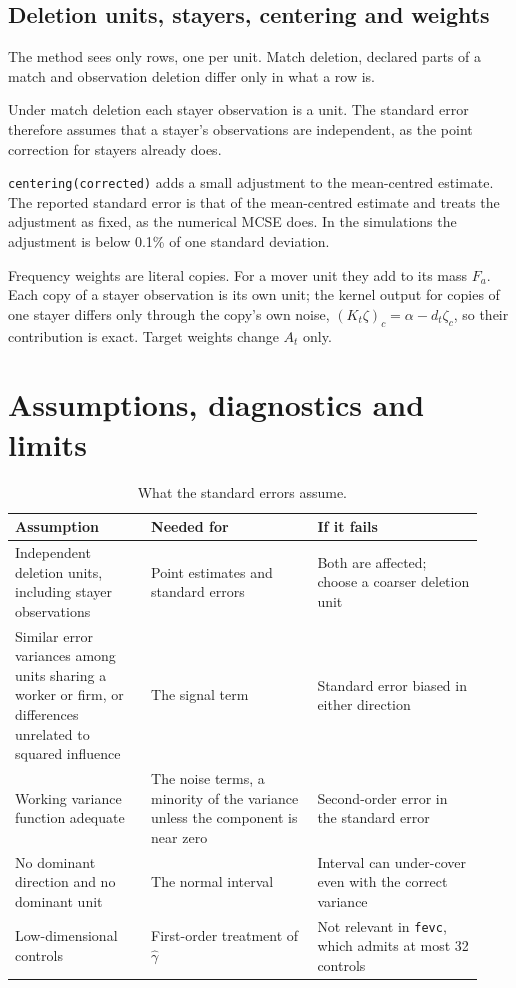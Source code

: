 \documentclass[11pt]{article}
\newcommand{\fevc}{\texttt{fevc}}
\begin{document}
\subsection{Deletion units, stayers, centering and weights}

\begin{description}[leftmargin=1.2em,style=nextline]
\item[Deletion units.] The method sees only rows, one per unit. Match
deletion, declared parts of a match and observation deletion differ only in
what a row is.
\item[Stayers.] Under match deletion each stayer observation is a unit.
The standard error therefore assumes that a stayer's observations are
independent, as the point correction for stayers already does.
\item[Corrected centering.] \texttt{centering(corrected)} adds a small
adjustment to the mean-centred estimate. The reported standard error is that
of the mean-centred estimate and treats the adjustment as fixed, as the
numerical MCSE does. In the simulations the adjustment is below 0.1\% of one
standard deviation.
\item[Weights.] Frequency weights are literal copies. For a mover unit they
add to its mass $F_a$. Each copy of a stayer observation is its own unit;
the kernel output for copies of one stayer differs only through the copy's
own noise, $(K_t\zeta)_c=\alpha-d_t\zeta_c$, so their contribution is exact.
Target weights change $A_t$ only.
\end{description}

\section{Assumptions, diagnostics and limits}\label{sec:assumptions}

\begin{table}[ht]
\centering\small
\begin{tabular}{@{}p{0.27\linewidth}p{0.33\linewidth}p{0.33\linewidth}@{}}
\toprule
Assumption & Needed for & If it fails \\
\midrule
Independent deletion units, including stayer observations &
Point estimates and standard errors &
Both are affected; choose a coarser deletion unit \\
Similar error variances among units sharing a worker or firm, or differences
unrelated to squared influence &
The signal term &
Standard error biased in either direction \\
Working variance function adequate &
The noise terms, a minority of the variance unless the component is near
zero &
Second-order error in the standard error \\
No dominant direction and no dominant unit &
The normal interval &
Interval can under-cover even with the correct variance \\
Low-dimensional controls &
First-order treatment of $\hat\gamma$ &
Not relevant in \fevc{}, which admits at most 32 controls \\
\bottomrule
\end{tabular}
\caption{What the standard errors assume.}\label{tab:assumptions}
\end{table}
\end{document}
